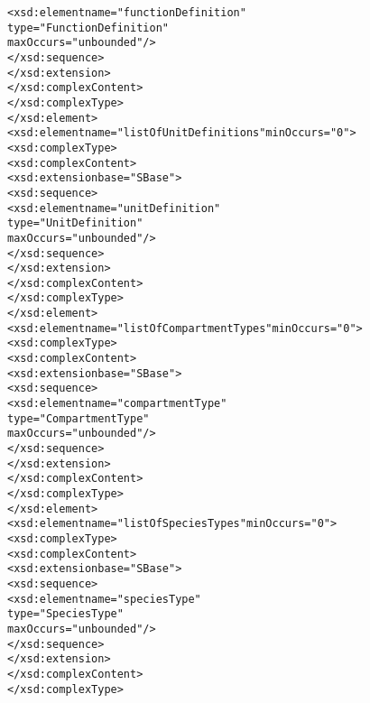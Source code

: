 \begin{alltt}
                                        <xsd:element name="functionDefinition" 
                                                     type="FunctionDefinition" 
                                                     maxOccurs="unbounded"/>
                                    </xsd:sequence>
                                </xsd:extension>
                            </xsd:complexContent>
                        </xsd:complexType>
                    </xsd:element>
                    <xsd:element name="listOfUnitDefinitions" minOccurs="0">
                        <xsd:complexType>
                            <xsd:complexContent>
                                <xsd:extension base="SBase">
                                    <xsd:sequence>
                                        <xsd:element name="unitDefinition" 
                                                     type="UnitDefinition" 
                                                     maxOccurs="unbounded"/>
                                    </xsd:sequence>
                                </xsd:extension>
                            </xsd:complexContent>
                        </xsd:complexType>
                    </xsd:element>
                    <xsd:element name="listOfCompartmentTypes" minOccurs="0">
                        <xsd:complexType>
                            <xsd:complexContent>
                                <xsd:extension base="SBase">
                                    <xsd:sequence>
                                        <xsd:element name="compartmentType" 
                                                     type="CompartmentType" 
                                                     maxOccurs="unbounded"/>
                                    </xsd:sequence>
                                </xsd:extension>
                            </xsd:complexContent>
                        </xsd:complexType>
                    </xsd:element>
                    <xsd:element name="listOfSpeciesTypes" minOccurs="0">
                        <xsd:complexType>
                            <xsd:complexContent>
                                <xsd:extension base="SBase">
                                    <xsd:sequence>
                                        <xsd:element name="speciesType" 
                                                     type="SpeciesType" 
                                                     maxOccurs="unbounded"/>
                                    </xsd:sequence>
                                </xsd:extension>
                            </xsd:complexContent>
                        </xsd:complexType>

\end{alltt}
